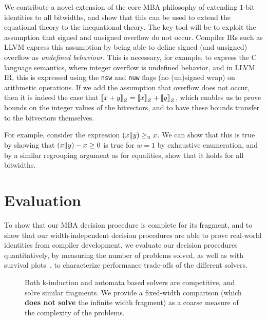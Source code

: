 We contribute a novel extension of the core MBA philosophy of extending $1$-bit identities to all bitwidths,
and show that this can be used to extend the equational theory to the inequational theory.
The key tool will be to exploit the assumption that signed and unsigned overflow do not occur.
Compiler IRs such as LLVM express this assumption by being able to define signed (and unsigned) overflow as \emph{undefined behaviour}.
This is necessary, for example, to express the C language semantics, where integer overflow is undefined behavior,
and in LLVM IR, this is expressed using the \texttt{nsw} and \texttt{nuw} flags (no (un)signed wrap) on arithmetic operations.
If we add the assumption that overflow does not occur, then it is indeed the case that $\left\llbracket x + y \right\rrbracket_Z = \left\llbracket x \right\rrbracket_Z + \left\llbracket y \right\rrbracket_Z$,
which enables us to prove bounds on the integer values of the bitvectors, and to have these bounds transfer to the bitvectors themselves.

For example, consider the expression $(x \| y) \geq_u x$.
We can show that this is true by showing that $(x \| y) - x \geq 0$ is true for $w = 1$ by exhaustive enumeration,
and by a similar regrouping argument as for equalities, show that it holds for all bitwidths.

\section{Evaluation}
\label{sec:swbv:evaluation}

To show that our MBA decision procedure is complete for its fragment,
and to show that our width-independent decision procedures are able to prove real-world identities from compiler development,
we evaluate our decision procedures quantitatively, by measuring the number of problems solved,
as well as with survival plots~\cite{brain2017benchmarking}, to characterize performance trade-offs of the different solvers.

\begin{figure}[htb]
{\small
{}
}
\caption{Both k-induction and automata based solvers are competitive, and solve similar fragments.
  We provide a fixed-width comparison (which \textbf{does not solve} the infinite width fragment)
  as a coarse measure of the complexity of the problems.}
\label{fig:swbv:table-eval}
\end{figure}

